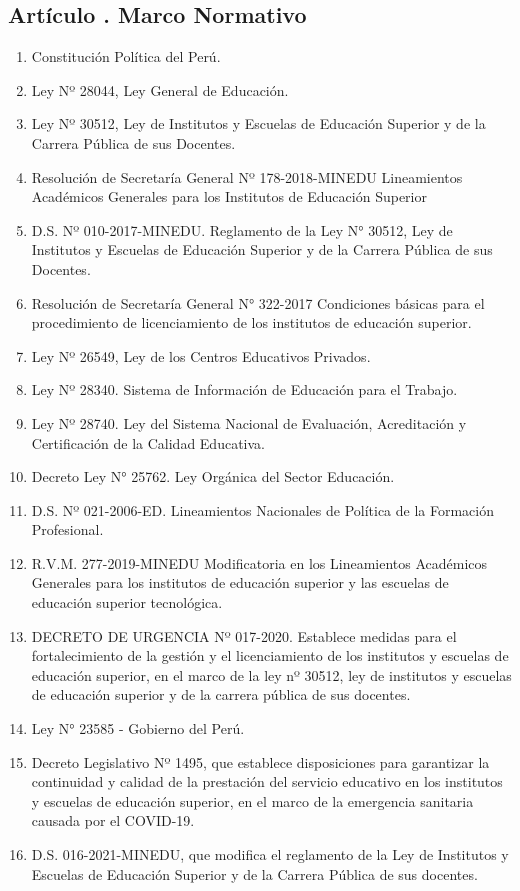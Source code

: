 \subsection{Artículo . Marco Normativo}
\addtocounter{ns}{1}
\begin{enumerate}
\item Constitución Política del Perú.
\item Ley Nº 28044, Ley General de Educación.
\item Ley Nº 30512, Ley de Institutos y Escuelas de Educación Superior y de la Carrera Pública de sus Docentes.
\item Resolución de Secretaría General Nº 178-2018-MINEDU Lineamientos Académicos Generales para los Institutos de Educación Superior
\item D.S. Nº 010-2017-MINEDU. Reglamento de la Ley N° 30512, Ley de Institutos y Escuelas de Educación Superior y de la Carrera Pública de sus Docentes.
\item Resolución de Secretaría General N° 322-2017 Condiciones básicas para el procedimiento de licenciamiento de los institutos de educación superior.
\item Ley Nº 26549, Ley de los Centros Educativos Privados.
\item Ley Nº 28340. Sistema de Información de Educación para el Trabajo.
\item Ley Nº 28740. Ley del Sistema Nacional de Evaluación, Acreditación y Certificación de la Calidad Educativa.
\item Decreto Ley N° 25762. Ley Orgánica del Sector Educación.
\item D.S. Nº 021-2006-ED. Lineamientos Nacionales de Política de la Formación Profesional.
\item R.V.M. 277-2019-MINEDU Modificatoria en los Lineamientos Académicos Generales para los institutos de educación superior y las escuelas de educación superior tecnológica.
\item DECRETO DE URGENCIA Nº 017-2020. Establece medidas para el fortalecimiento de la gestión y el licenciamiento de los institutos y escuelas de educación superior, en el marco de la ley nº 30512, ley de institutos y escuelas de educación superior y de la carrera pública de sus docentes.
\item Ley N° 23585 - Gobierno del Perú.
\item Decreto Legislativo Nº 1495, que establece disposiciones para garantizar la continuidad y calidad de la prestación del servicio educativo en los institutos y escuelas de educación superior, en el marco de la emergencia sanitaria causada por el COVID-19.
\item D.S. 016-2021-MINEDU, que modifica el reglamento de la Ley de Institutos y Escuelas de Educación Superior y de la Carrera Pública de sus docentes.
\end{enumerate}
